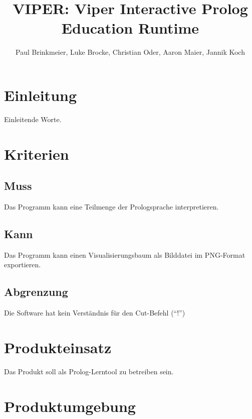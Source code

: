 \documentclass[parskip=full,11pt,twoside]{scrartcl}
\title{VIPER: Viper Interactive Prolog Education Runtime}
\author{Paul Brinkmeier, Luke Brocke, Christian Oder, Aaron Maier, Jannik Koch}
\begin{document}
\maketitle

\section{Einleitung}

Einleitende Worte.

\pagebreak
\section{Kriterien}

\subsection{Muss}


Das Programm kann eine Teilmenge der Prologsprache interpretieren.

\subsection{Kann}


Das Programm kann einen Visualisierungsbaum als Bilddatei im PNG-Format exportieren.

\subsection{Abgrenzung}


Die Software hat kein Verständnis für den Cut-Befehl (\enquote{!})

\pagebreak
\section{Produkteinsatz}

Das Produkt soll als Prolog-Lerntool zu betreiben sein.

\section{Produktumgebung}
\end{document}
